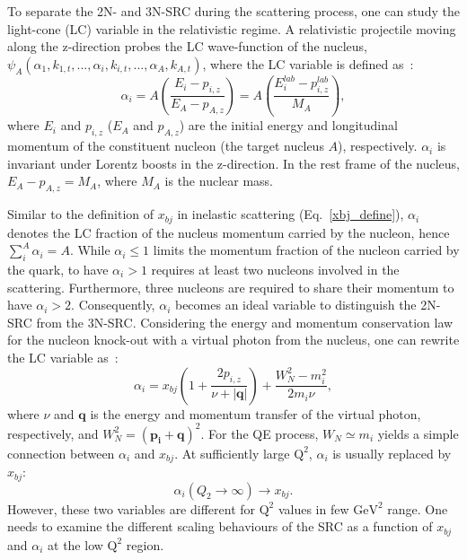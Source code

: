  To separate the 2N- and 3N-SRC during the scattering process, one can study the light-cone (LC) variable in the relativistic regime. A relativistic projectile moving along the z-direction probes the LC wave-function of the nucleus, $\psi_{A}(\alpha_{1},k_{1,t},...,\alpha_{i},k_{i,t},...,\alpha_{A},k_{A,t})$, where the LC variable is defined as~\cite{Frankfurt_misak}:
\begin{equation}
  \alpha_{i} = A\left(\frac{E_{i}-p_{i,z}}{E_{A}-p_{A,z}}\right)=A\left(\frac{E_{i}^{lab}-p_{i,z}^{lab}}{M_{A}}\right),
\end{equation}  
where $E_{i}$ and $p_{i,z}$ ($E_{A}$ and $p_{A,z}$) are the initial energy and longitudinal momentum of the constituent nucleon (the target nucleus $A$), respectively. $\alpha_{i}$ is invariant under Lorentz boosts in the z-direction. In the rest frame of the nucleus, $E_{A}-p_{A,z}=M_{A}$, where $M_{A}$ is the nuclear mass. 

 Similar to the definition of $x_{bj}$ in inelastic scattering (Eq.~\ref{xbj_define}), $\alpha_{i}$ denotes the LC fraction of the nucleus momentum carried by the nucleon, hence $\sum_{i}^{A}\alpha_{i}=A$. While $\alpha_{i}\leq 1$ limits the momentum fraction of the nucleon carried by the quark, to have $\alpha_{i}>1$ requires at least two nucleons involved in the scattering. Furthermore, three nucleons are required to share their momentum to have $\alpha_{i}>2$. Consequently, $\alpha_{i}$ becomes an ideal variable to distinguish the 2N-SRC from the 3N-SRC. Considering the energy and momentum conservation law for the nucleon knock-out with a virtual photon from the nucleus, one can rewrite the LC variable as~\cite{Frankfurt_misak}:
\begin{equation}
  \alpha_{i}=x_{bj}\left(1+\frac{2p_{i,z}}{\nu+|\mathbf{q}|}\right)+\frac{W_{N}^{2}-m_{i}^{2}}{2m_{i}\nu},
  \label{alpha_xbj}
\end{equation}
where $\nu$ and $\mathbf{q}$ is the energy and momentum transfer of the virtual photon, respectively, and $W_{N}^{2}=(\mathbf{p_{i}}+\mathbf{q})^{2}$. For the QE process, $W_{N}\simeq m_{i}$ yields a simple connection between $\alpha_{i}$ and $x_{bj}$. At sufficiently large $\mathrm{Q^{2}}$, $\alpha_{i}$ is usually replaced by $x_{bj}$: 
\begin{equation}
  \alpha_{i} (Q_{2}\rightarrow \infty)\rightarrow x_{bj}. 
\end{equation}
However, these two variables are different for $\mathrm{Q^{2}}$ values in few $\mathrm{GeV^{2}}$ range. One needs to examine the different scaling behaviours of the SRC as a function of $x_{bj}$ and $\alpha_{i}$ at the low $\mathrm{Q^{2}}$ region. 	

